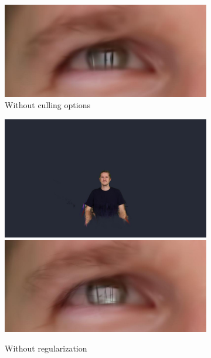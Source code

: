 \begin{figure}[ht]
\begin{subfigure}{0.48\linewidth}
		\includegraphics[width=\textwidth]{Figures/methods/splatfacto_methods/eyes_reg_only.png}
		\caption{Without culling options}
		\label{fig:3dsplatting-without-cull}
	\end{subfigure}
	\vfil
	\begin{subfigure}{0.48\linewidth}
		\includegraphics[width=\textwidth]{Figures/methods/splatfacto_methods/no_cull.png}
		\includegraphics[width=\textwidth]{Figures/methods/splatfacto_methods/eyes_no_cull.png}
		\caption{Without regularization}
		\label{fig:3dsplatting-without-reg}
	\end{subfigure}
	\begin{subfigure}{0.48\linewidth}

\end{subfigure}
\end{figure}
